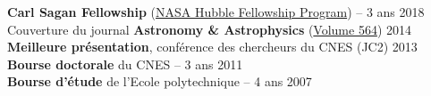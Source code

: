 \documentclass[11pt,a4paper, french]{article}
\begin{document}
\textbf{Carl Sagan Fellowship} (\href{http://www.stsci.edu/stsci-research/fellowships/nasa-hubble-fellowship-program}{NASA Hubble Fellowship Program}) -- 3 ans \hfill   2018\\

\vspace{-0.15cm}
Couverture du journal \textbf{Astronomy \& Astrophysics} (\href{https://www.aanda.org/articles/aa/abs/2014/04/contents/contents.html}{Volume 564}) \hfill  2014\\

\vspace{-0.15cm}
\textbf{Meilleure présentation}, conférence des chercheurs du CNES (JC2) \hfill   2013\\

\vspace{-0.15cm}
\textbf{Bourse doctorale} du CNES -- 3 ans \hfill   2011\\

\vspace{-0.15cm}
\textbf{Bourse d'étude} de l'Ecole polytechnique -- 4 ans \hfill   2007\\

\end{document}
